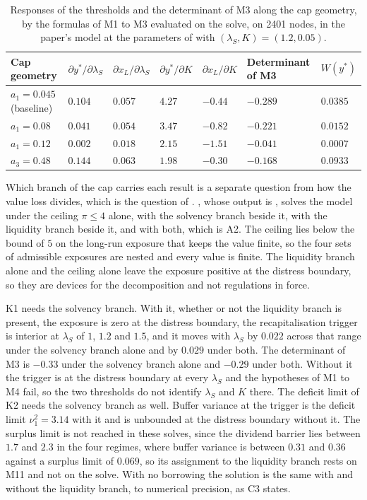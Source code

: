 \begin{table}[H]
\footnotesize
\caption{Responses of the thresholds and the determinant of M3 along the cap geometry, by the formulas of M1 to M3 evaluated on the solve, on 2401 nodes, in the paper's model at the parameters of \citet{bayraktar2026} with $(\lambda_S,K)=(1.2,0.05)$.}\label{tab:q3-det}
\begin{tabular}{@{}lllllll@{}}
\toprule
Cap geometry & $\partial y^*/\partial\lambda_S$ & $\partial x_L/\partial\lambda_S$ & $\partial y^*/\partial K$ & $\partial x_L/\partial K$ & Determinant of M3 & $W(y^*)$ \\
\midrule
$a_1=0.045$ (baseline) & $0.104$ & $0.057$ & $4.27$ & $-0.44$ & $-0.289$ & $0.0385$ \\
$a_1=0.08$ & $0.041$ & $0.054$ & $3.47$ & $-0.82$ & $-0.221$ & $0.0152$ \\
$a_1=0.12$ & $0.002$ & $0.018$ & $2.15$ & $-1.51$ & $-0.041$ & $0.0007$ \\
$a_3=0.48$ & $0.144$ & $0.063$ & $1.98$ & $-0.30$ & $-0.168$ & $0.0933$ \\
\bottomrule
\end{tabular}
\end{table}

Which branch of the cap carries each result is a separate question from how
the value loss divides, which is the question of \citet{bayraktar2026}.
, whose output is
, solves the model under the ceiling
$\pi\le4$ alone, with the solvency branch beside it, with the liquidity branch
beside it, and with both, which is A2. The ceiling lies below the bound of $5$
on the long-run exposure that keeps the value finite, so the four sets of
admissible exposures are nested and every value is finite. The liquidity
branch alone and the ceiling alone leave the exposure positive at the distress
boundary, so they are devices for the decomposition and not regulations in
force.

K1 needs the solvency branch. With it, whether or not the liquidity branch is
present, the exposure is zero at the distress boundary, the recapitalisation
trigger is interior at $\lambda_S$ of $1$, $1.2$ and $1.5$, and it moves with
$\lambda_S$ by $0.022$ across that range under the solvency branch alone and
by $0.029$ under both. The determinant of M3 is $-0.33$ under the solvency
branch alone and $-0.29$ under both. Without it the trigger is at the distress
boundary at every $\lambda_S$ and the hypotheses of M1 to M4 fail, so the
two thresholds do not identify $\lambda_S$ and $K$ there. The deficit limit
of K2 needs the solvency branch as well. Buffer variance at the trigger is the
deficit limit $\nu_1^2=3.14$ with it and is unbounded at the distress boundary
without it. The surplus limit is not reached in these solves, since the
dividend barrier lies between $1.7$ and $2.3$ in the four regimes, where
buffer variance is between $0.31$ and $0.36$ against a surplus limit of
$0.069$, so its assignment to the liquidity branch rests on M11 and not on the
solve. With no borrowing the solution is the same with and without the
liquidity branch, to numerical precision, as C3 states.

